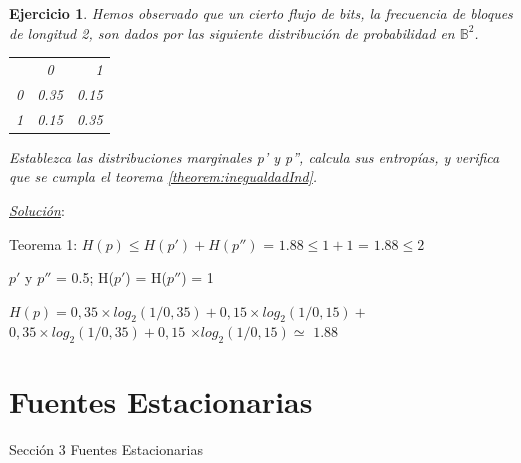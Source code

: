 \documentclass{beamer}
\theoremstyle{plain}
\theoremstyle{example}
\newtheorem{ejercicio} [Ejercicio]{Ejercicio}
\theoremstyle{example}
\begin{document}
\begin{frame}  \footnotesize 

\begin{ejercicio}

Hemos observado que un cierto flujo de bits, la frecuencia de bloques de longitud 2, son dados por las siguiente distribución de probabilidad en $\mathbb{B}^2$.

\begin{center}
 \begin{tabular}{ l c r }
         & 0 & 1 \\
   0 & 0.35 & 0.15 \\
   1 & 0.15 & 0.35 \\
 \end{tabular}
\end{center}

Establezca las distribuciones marginales p' y p'', calcula sus entropías, y verifica que se cumpla el teorema \ref{theorem:inegualdadInd}.
\end{ejercicio}

\pause

\textit{\underline{Solución}}:\\
\vspace{0.5cm}


Teorema 1: $H(p) \leq H(p') + H(p'')$ = $1.88 \leq 1 + 1$ = {\boldmath $1.88 \leq 2$}

\vspace{0.5cm}

$p'$ y $p''$ = 0.5; H($p'$) = H($p''$) = 1\\

\vspace{0.5cm}

$H(p) = 0,35 \times log_2(1/0,35 )+ 0,15 \times log_2(1/0,15) + $
$ 0,35 \times log_2(1/0,35 )+ 0,15$
$ \times log_2(1/0,15)$$  \simeq  $ {\boldmath  $1.88$}  
 

\end{frame} 


\section{Fuentes Estacionarias} 

\begin{frame}   \footnotesize
{
\begin{block}{Sección 3}
Fuentes Estacionarias
\end{block}
}
\end{frame} 
\end{document}
